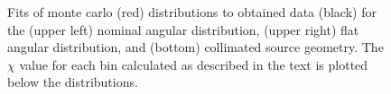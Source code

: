 \begin{figure}[htb]
\centering
{} 
\caption{\label{results} Fits of monte carlo (red) distributions to obtained data (black) for the (upper left) nominal angular distribution, (upper right) flat angular distribution, and (bottom) collimated source geometry. The $\chi$ value for each bin calculated as described in the text is plotted below the distributions. }
\end{figure}



